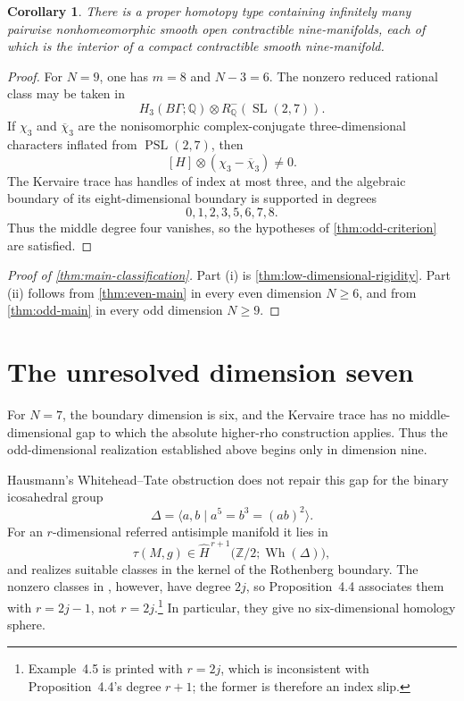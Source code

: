 \documentclass[10pt,reqno]{amsart}
\numberwithin{equation}{section}
\newtheorem{corollary}{Corollary}
\theoremstyle{definition}
\theoremstyle{remark}
\newcommand{\Z}{\mathbb Z}
\newcommand{\Q}{\mathbb Q}
\newcommand{\Wh}{\operatorname{Wh}}
\newcommand{\SL}{\operatorname{SL}}
\newcommand{\PSL}{\operatorname{PSL}}
\begin{document}
\begin{corollary}\label{cor:dimension-nine}
There is a proper homotopy type containing infinitely many pairwise
nonhomeomorphic smooth open contractible nine-manifolds, each of which
is the interior of a compact contractible smooth nine-manifold.
\end{corollary}

\begin{proof}
For \(N=9\), one has \(m=8\) and \(N-3=6\).  The nonzero reduced
rational class may be taken in
\[
H_3(B\Gamma;\Q)
\otimes
R^-_{\Q}(\SL(2,7)).
\]
If \(\chi_3\) and \(\overline\chi_3\) are the nonisomorphic
complex-conjugate three-dimensional characters inflated from
\(\PSL(2,7)\), then
\[
[H]\otimes(\chi_3-\overline\chi_3)\neq0.
\]
The Kervaire trace has handles of index at most three, and the
algebraic boundary of its eight-dimensional boundary is supported in
degrees
\[
0,1,2,3,5,6,7,8.
\]
Thus the middle degree four vanishes, so the hypotheses of
\cref{thm:odd-criterion} are satisfied.
\end{proof}

\begin{proof}[Proof of \cref{thm:main-classification}]
Part \textup{(i)} is \cref{thm:low-dimensional-rigidity}.
Part \textup{(ii)} follows from \cref{thm:even-main} in every even
dimension \(N\geq6\), and from \cref{thm:odd-main} in every odd
dimension \(N\geq9\).
\end{proof}


\section{The unresolved dimension seven}
\label{sec:dimension-seven}

For \(N=7\), the boundary dimension is six, and the Kervaire trace has
no middle-dimensional gap to which the absolute higher-rho construction
applies.  Thus the odd-dimensional realization established above begins
only in dimension nine.

Hausmann's Whitehead--Tate obstruction does not repair this gap for the
binary icosahedral group
\[
\Delta=\langle a,b\mid a^5=b^3=(ab)^2\rangle.
\]
For an \(r\)-dimensional referred antisimple manifold it lies in
\[
\tau(M,g)\in
\widehat H^{\,r+1}\bigl(\Z/2;\Wh(\Delta)\bigr),
\]
and \cite[Proposition~4.4]{HausmannCellDispensability} realizes suitable
classes in the kernel of the Rothenberg boundary.  The nonzero classes in
\cite[Example~4.5(3)]{HausmannCellDispensability}, however, have degree
\(2j\), so Proposition~4.4 associates them with \(r=2j-1\), not
\(r=2j\).\footnote{Example~4.5 is printed with \(r=2j\), which is
inconsistent with Proposition~4.4's degree \(r+1\); the former is
therefore an index slip.}  In particular, they give no six-dimensional
homology sphere.
\end{document}
